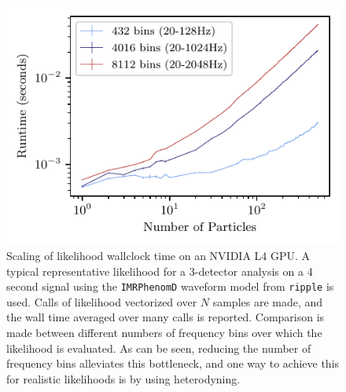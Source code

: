 \documentclass[fleqn,usenatbib]{mnras}
\begin{document}
\begin{figure}
    \centering
    \includegraphics[width=1.0\columnwidth]{figures/likelihood_scaling.pdf}
    \caption{Scaling of likelihood wallclock time on an NVIDIA L4 GPU. 
    A typical representative likelihood for a 3-detector analysis 
    on a 4 second signal using the \texttt{IMRPhenomD} waveform model from 
    \texttt{ripple} is used. Calls of likelihood vectorized over $N$ 
    samples are made, and the wall time averaged over many calls is reported. 
    Comparison is made between different numbers of frequency bins over 
    which the likelihood is evaluated. As can be seen, reducing the number of 
    frequency bins alleviates this bottleneck, and one way to achieve this for
    realistic likelihoods is by using heterodyning.}
    \label{fig:scaling_l4}
\end{figure}
\end{document}
